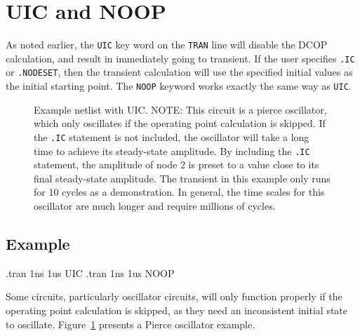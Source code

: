 \newpage
\section{UIC and NOOP}
\label{UIC_NOOP_spec}
 
As noted earlier, the \texttt{UIC} key word on the \texttt{TRAN} line
will disable the DCOP calculation, and result in \Xyce{} immediately
going to transient.  If the user specifies \texttt{.IC} or
\texttt{.NODESET}, then the transient
calculation will use the specified initial values as the initial
starting point.  The \texttt{NOOP} keyword works exactly the same way
as \texttt{UIC}.

\begin{figure}[htbp]
\begin{centering}
\caption[Example netlist with UIC.] {Example netlist with UIC. 
NOTE: This circuit is a pierce oscillator, which only oscillates if
the operating point calculation is skipped.  If the \texttt{.IC} statement is
not included, the oscillator will take a long time to achieve its
steady-state amplitude.  By including the \texttt{.IC} statement, the
amplitude of node 2 is preset to a value close to its final
steady-state amplitude.  The transient in this example only runs for
10 cycles as a demonstration.  In general, the time scales for this
oscillator are much longer and require millions of
cycles.  \label{UIC_Netlist}}
\end{centering}
\end{figure}

\subsection{Example}
\begin{vquote}
.tran 1ns 1us  UIC
.tran 1ns 1us  NOOP
\end{vquote}

Some circuits, particularly oscillator circuits, will only function properly if the operating point calculation
is skipped, as they need an inconsistent initial state to oscillate.  Figure~\ref{UIC_Netlist} presents a Pierce oscillator example.


